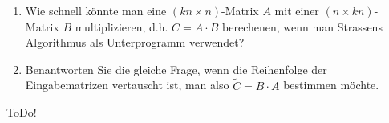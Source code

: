
\begin{exercise}

\begin{enumerate}[label = (\alph*)]
  \item Wie schnell könnte man eine $(kn \times n)$-Matrix $A$ mit einer $(n \times kn)$-Matrix
  $B$ multiplizieren, d.h. $C = A \cdot B$ berechenen, wenn man Strassens Algorithmus als Unterprogramm verwendet?
  \item Benantworten Sie die gleiche Frage, wenn die Reihenfolge der Eingabematrizen vertauscht ist, man also
  $\tilde{C} = B \cdot A$ bestimmen möchte.
\end{enumerate}

\end{exercise}


\begin{solution}

ToDo!

\end{solution}

